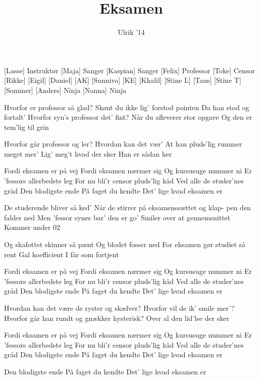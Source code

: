 \documentclass[a4paper,11pt]{article}
\title{Eksamen}
\author{Ulrik '14}
\begin{document}
\maketitle

\begin{roles}
[Lasse] Instruktør
[Maja] Sanger
[Kaspian] Sanger
[Felix] Professor
[Toke] Censor
[Rikke] 
[Eigil] 
[Daniel] 
[AK] 
[Sunniva] 
[KE] 
[Khalil] 
[Stine L] 
[Taus] 
[Stine T] 
[Sommer] 
[Anders] Ninja
[Nanna] Ninja
\end{roles}

\begin{song}
 Hvorfor er professor så glad?
Skønt du ikke lig' forstod pointen
Da han stod og fortalt'
 Hvorfor syn's professor det' fint?
Når du afleverer stor opgave
Og den er tem'lig til grin

 Hvorfor går professor og ler?
Hvordan kan det vær'
At han pluds'lig rummer meget mer'
Lig' meg't hvad der sker
Han er sådan her

 Fordi eksamen er på vej
Fordi eksamen nærmer sig
Og kursusuge nummer ni
Er 'fessors allerbedste leg
For nu bli'r censor pluds'lig kåd
Ved alle de studer'nes gråd
Den blodigste ende
På faget du kendte
Det' lige hvad eksamen er

 De studerende bliver så ked'
Når de stirrer på eksamenssættet og klap-
pen den falder ned
 Men 'fessor synes bar' den er go'
Smiler over at gennemsnittet
Kommer under 02

 Og skafottet skinner så pænt
Og blodet fosser ned
For eksamen gør studiet så rent
Gal koefficient
I får som fortjent

 Fordi eksamen er på vej
Fordi eksamen nærmer sig
Og kursusuge nummer ni
Er 'fessors allerbedste leg
For nu bli'r censor pluds'lig kåd
Ved alle de studer'nes gråd
Den blodigste ende
På faget du kendte
Det' lige hvad eksamen er

 Hvordan kan det være de ryster og skælver?
Hvorfor vil de ik' smile mer'?
 Hvorfor går han rundt og gnækker hysterisk?
Over al den lid'lse der sker

 Fordi eksamen er på vej
Fordi eksamen nærmer sig
Og kursusuge nummer ni
Er 'fessors allerbedste leg
For nu bli'r censor pluds'lig kåd
Ved alle de studer'nes gråd
Den blodigste ende
På faget du kendte
Det' lige hvad eksamen er

 Den blodigste ende
På faget du kendte
Det' lige hvad eksamen er
\end{song}
\end{document}
